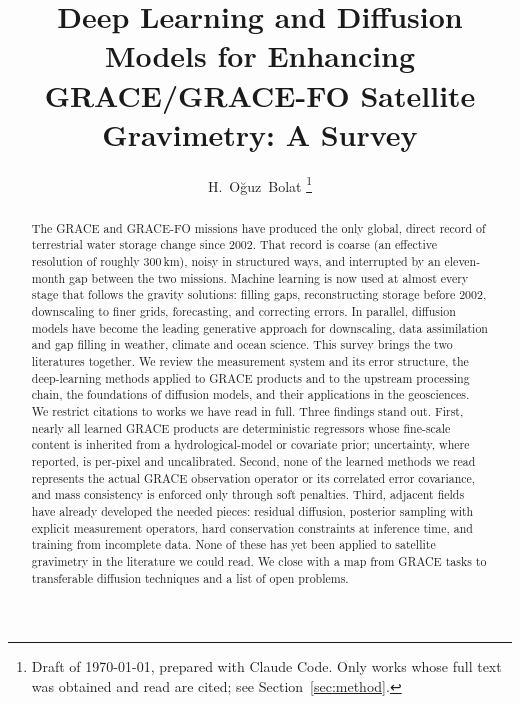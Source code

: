 \documentclass[journal]{IEEEtran}
\begin{document}
\title{Deep Learning and Diffusion Models for Enhancing GRACE/GRACE-FO Satellite Gravimetry: A Survey}

\author{H.~O\u{g}uz~Bolat%
\thanks{Draft of \today, prepared with Claude Code. Only works whose full text was obtained and read are cited; see Section~\ref{sec:method}.}}


\maketitle

\begin{abstract}
The GRACE and GRACE-FO missions have produced the only global, direct record of terrestrial water storage change since 2002. That record is coarse (an effective resolution of roughly 300\,km), noisy in structured ways, and interrupted by an eleven-month gap between the two missions. Machine learning is now used at almost every stage that follows the gravity solutions: filling gaps, reconstructing storage before 2002, downscaling to finer grids, forecasting, and correcting errors. In parallel, diffusion models have become the leading generative approach for downscaling, data assimilation and gap filling in weather, climate and ocean science. This survey brings the two literatures together. We review the measurement system and its error structure, the deep-learning methods applied to GRACE products and to the upstream processing chain, the foundations of diffusion models, and their applications in the geosciences. We restrict citations to works we have read in full. Three findings stand out. First, nearly all learned GRACE products are deterministic regressors whose fine-scale content is inherited from a hydrological-model or covariate prior; uncertainty, where reported, is per-pixel and uncalibrated. Second, none of the learned methods we read represents the actual GRACE observation operator or its correlated error covariance, and mass consistency is enforced only through soft penalties. Third, adjacent fields have already developed the needed pieces: residual diffusion, posterior sampling with explicit measurement operators, hard conservation constraints at inference time, and training from incomplete data. None of these has yet been applied to satellite gravimetry in the literature we could read. We close with a map from GRACE tasks to transferable diffusion techniques and a list of open problems.
\end{abstract}
\end{document}
